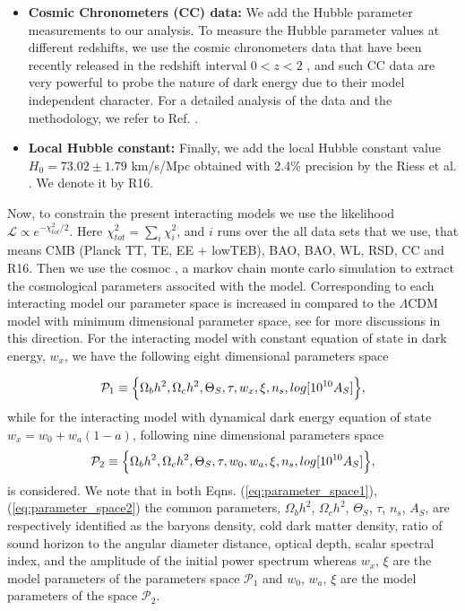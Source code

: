 \documentclass[superscriptaddress,oneolumn,secnumarabic,
amssymb,amsmath,nobibnotes,aps,prd,showpacs,nofootinbib]{revtex4}%
\begin{document}
\begin{itemize}
\item \textbf{Cosmic Chronometers (CC) data:} We add the Hubble parameter measurements to our analysis. To measure the Hubble 
parameter values at different redshifts, we use the cosmic
chronometers data that have been recently released
in the redshift interval $0 < z < 2$ \cite{Moresco:2016mzx}, and such CC data are 
very powerful to probe the nature of dark
energy due to their model independent character. For a
detailed analysis of the data and the methodology,
we refer to Ref. \cite{Moresco:2016mzx}. \newline

\item \textbf{Local Hubble constant:} Finally, we add the local Hubble constant value
$H_0= 73.02 \pm 1.79$  km/s/Mpc  obtained with 2.4\%
precision by the Riess et al. \cite{Riess:2016jrr}. We denote it
by R16.

\end{itemize}

Now, to constrain the present interacting models we use the likelihood $\mathcal{L}\propto e^{-\chi^2_{tot}/2}$. Here $\chi^2_{tot} = \sum _{i} \chi^2_i$, and $i$ runs over the all data sets that we use, that means CMB (Planck TT, TE, EE $+$ lowTEB), BAO, BAO, WL, RSD, CC and R16. Then we use the cosmoc \cite{Lewis:2002ah}, a markov chain monte carlo simulation to extract the cosmological parameters associted with the model.
Corresponding to each interacting model our parameter space is increased in compared to the $\Lambda$CDM model with minimum dimensional parameter space, see \cite{Barrow:2014opa} for more discussions in this direction. For the interacting model with constant equation of state in dark energy, $w_x$, we have the following eight dimensional parameters space

\begin{align}
\mathcal{P}_1 \equiv\Bigl\{\Omega_bh^2, \Omega_{c}h^2, \Theta_S, \tau, w_x, \xi, n_s, log[10^{10}A_S]\Bigr\},
\label{eq:parameter_space1}
\end{align}
while for the interacting model with dynamical dark energy equation of state $w_x = w_0 + w_a (1-a)$, following nine dimensional parameters space
\begin{align}
\mathcal{P}_2 \equiv\Bigl\{\Omega_bh^2, \Omega_{c}h^2, \Theta_S, \tau, w_0, w_a, \xi, n_s, log[10^{10}A_S]\Bigr\},
\label{eq:parameter_space2}
\end{align}
is considered. We note that in both Eqns. (\ref{eq:parameter_space1}), (\ref{eq:parameter_space2}) the common parameters, $\Omega_bh^2$, $\Omega_{c}h^2$, $\Theta_S$, $\tau$, $n_s$, $A_S$, are respectively identified as the baryons density, cold dark matter density, ratio of sound horizon to the angular diameter distance, optical depth, scalar spectral index, and the amplitude of the initial power spectrum whereas $w_x$, $\xi$ are the model parameters of the parameters space $\mathcal{P}_1$ and $w_0$, $w_a$, $\xi$ are the model parameters of the space $\mathcal{P}_2$.
\end{document}
